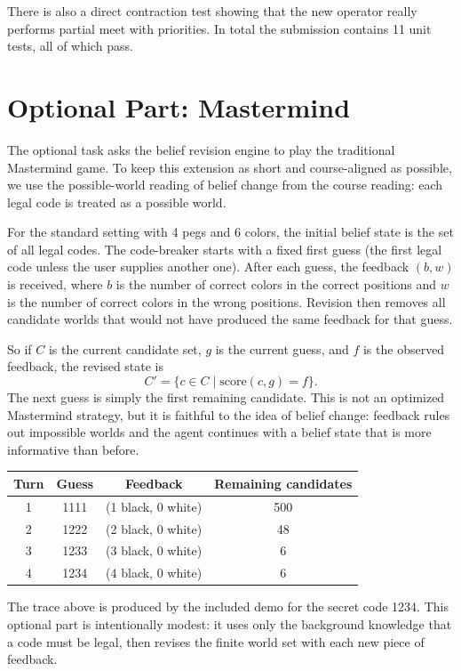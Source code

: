 \documentclass[11pt,a4paper]{article}
\begin{document}
There is also a direct contraction test showing that the new operator really performs partial meet with priorities. In total the submission contains 11 unit tests, all of which pass.

\section{Optional Part: Mastermind}
The optional task asks the belief revision engine to play the traditional Mastermind game. To keep this extension as short and course-aligned as possible, we use the possible-world reading of belief change from the course reading: each legal code is treated as a possible world.

For the standard setting with 4 pegs and 6 colors, the initial belief state is the set of all legal codes. The code-breaker starts with a fixed first guess (the first legal code unless the user supplies another one). After each guess, the feedback \((b,w)\) is received, where \(b\) is the number of correct colors in the correct positions and \(w\) is the number of correct colors in the wrong positions. Revision then removes all candidate worlds that would not have produced the same feedback for that guess.

So if \(C\) is the current candidate set, \(g\) is the current guess, and \(f\) is the observed feedback, the revised state is
\[
C' = \{c \in C \mid \mathrm{score}(c,g) = f\}.
\]
The next guess is simply the first remaining candidate. This is not an optimized Mastermind strategy, but it is faithful to the idea of belief change: feedback rules out impossible worlds and the agent continues with a belief state that is more informative than before.

\begin{center}
\small
\begin{tabular}{cccc}
\toprule
Turn & Guess & Feedback & Remaining candidates \\
\midrule
1 & 1111 & (1 black, 0 white) & 500 \\
2 & 1222 & (2 black, 0 white) & 48 \\
3 & 1233 & (3 black, 0 white) & 6 \\
4 & 1234 & (4 black, 0 white) & 6 \\
\bottomrule
\end{tabular}
\end{center}

The trace above is produced by the included demo for the secret code 1234. This optional part is intentionally modest: it uses only the background knowledge that a code must be legal, then revises the finite world set with each new piece of feedback.
\end{document}

